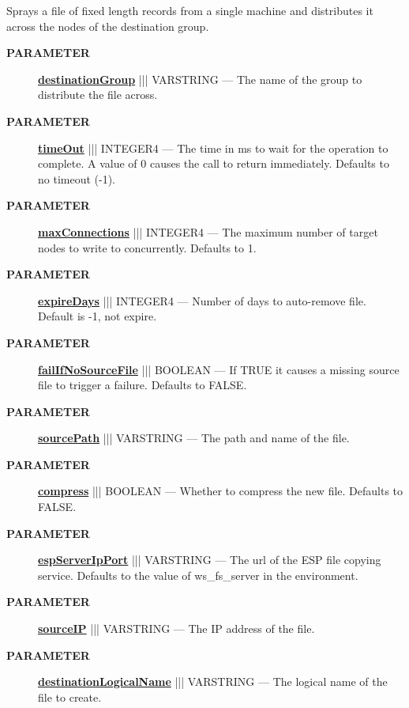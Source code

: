 \par





Sprays a file of fixed length records from a single machine and distributes it across the nodes of the destination group.






\par
\begin{description}
\item [\colorbox{tagtype}{\color{white} \textbf{\textsf{PARAMETER}}}] \textbf{\underline{destinationGroup}} ||| VARSTRING --- The name of the group to distribute the file across.
\item [\colorbox{tagtype}{\color{white} \textbf{\textsf{PARAMETER}}}] \textbf{\underline{timeOut}} ||| INTEGER4 --- The time in ms to wait for the operation to complete. A value of 0 causes the call to return immediately. Defaults to no timeout (-1).
\item [\colorbox{tagtype}{\color{white} \textbf{\textsf{PARAMETER}}}] \textbf{\underline{maxConnections}} ||| INTEGER4 --- The maximum number of target nodes to write to concurrently. Defaults to 1.
\item [\colorbox{tagtype}{\color{white} \textbf{\textsf{PARAMETER}}}] \textbf{\underline{expireDays}} ||| INTEGER4 --- Number of days to auto-remove file. Default is -1, not expire.
\item [\colorbox{tagtype}{\color{white} \textbf{\textsf{PARAMETER}}}] \textbf{\underline{failIfNoSourceFile}} ||| BOOLEAN --- If TRUE it causes a missing source file to trigger a failure. Defaults to FALSE.
\item [\colorbox{tagtype}{\color{white} \textbf{\textsf{PARAMETER}}}] \textbf{\underline{sourcePath}} ||| VARSTRING --- The path and name of the file.
\item [\colorbox{tagtype}{\color{white} \textbf{\textsf{PARAMETER}}}] \textbf{\underline{compress}} ||| BOOLEAN --- Whether to compress the new file. Defaults to FALSE.
\item [\colorbox{tagtype}{\color{white} \textbf{\textsf{PARAMETER}}}] \textbf{\underline{espServerIpPort}} ||| VARSTRING --- The url of the ESP file copying service. Defaults to the value of ws\_fs\_server in the environment.
\item [\colorbox{tagtype}{\color{white} \textbf{\textsf{PARAMETER}}}] \textbf{\underline{sourceIP}} ||| VARSTRING --- The IP address of the file.
\item [\colorbox{tagtype}{\color{white} \textbf{\textsf{PARAMETER}}}] \textbf{\underline{destinationLogicalName}} ||| VARSTRING --- The logical name of the file to create.

\end{description}
